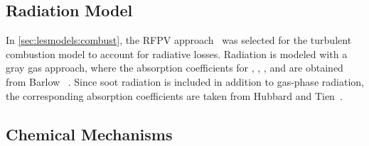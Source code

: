 







\subsection{Radiation Model}
\label{sec:lesresults:comput:rad}

In \cref{sec:lesmodels:combust}, the RFPV approach~\cite{ihme2008} was selected for the turbulent combustion model to account for radiative losses. Radiation is modeled with a gray gas approach, where the absorption coefficients for , , , and  are obtained from Barlow \etal~\cite{barlow2001}. Since soot radiation is included in addition to gas-phase radiation, the corresponding absorption coefficients are taken from Hubbard and Tien~\cite{hubbard1978}.


\subsection{Chemical Mechanisms}
\label{sec:lesresults:comput:chem}

